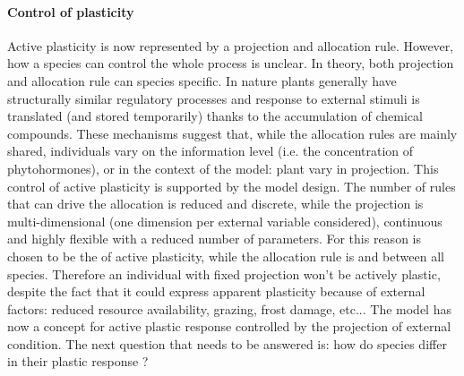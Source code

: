 \paragraph{Control of plasticity}
Active plasticity is now represented by a projection and allocation rule. However, how a species can control the whole process is unclear. In theory, both projection and allocation rule can species specific. In nature plants generally have structurally similar regulatory processes and response to external stimuli is translated (and stored temporarily) thanks to the accumulation of chemical compounds\parencite{need-references}. These mechanisms suggest that, while the allocation rules are mainly shared, individuals vary on the information level (i.e. the concentration of phytohormones), or in the context of the model: plant vary in projection. This control of active plasticity is supported by the model design. The number of rules that can drive the allocation is reduced and discrete, while the projection is multi-dimensional (one dimension per external variable considered), continuous and highly flexible with a reduced number of parameters.
For this reason  is chosen to be the  of active plasticity, while the allocation rule is  and  between all species. Therefore an individual with fixed projection won't be actively plastic, despite the fact that it could express apparent plasticity because of external factors: reduced resource availability, grazing, frost damage, etc... The model has now a concept for active plastic response controlled by the projection of external condition. The next question that needs to be answered is: how do species differ in their plastic response ?\\


